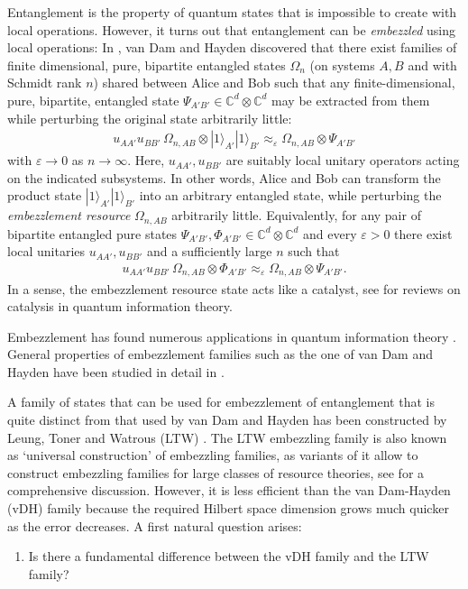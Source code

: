 \documentclass[a4paper, 10pt, onecolumn, accepted=2025-07-22]{quantumarticle}
\theoremstyle{definition}
\newcommand{\ket}[1]{|#1\rangle}
\newcommand{\oo}{\infty}
\newcommand{\ox}{\otimes}
\newcommand{\eps}{\varepsilon}
\def\CC{{\mathbb C}}
\newcommand*{\1}{\text{\usefont{U}{bbold}{m}{n}1}}
\begin{document}
Entanglement is the property of quantum states that is impossible to create with local operations.
However, it turns out that entanglement can be \emph{embezzled} using local operations: In \cite{van_dam2003universal}, van Dam and Hayden discovered that there exist families of finite dimensional, pure, bipartite entangled states $\Omega_n$ (on systems $A,B$ and with Schmidt rank $n$) shared between Alice and Bob such that any finite-dimensional, pure, bipartite, entangled state $\Psi_{A'B'}\in\CC^d\ox\CC^d$ may be extracted from them while perturbing the original state arbitrarily little:
\begin{align}
    u_{AA'}u_{BB'} \,\Omega_{n,AB}\ox \ket 1_{A'}\ket 1_{B'} \approx_\eps \Omega_{n,AB} \ox \Psi_{A'B'}
\end{align}
with $\eps\to 0$ as $n\to \oo$. Here, $u_{AA'},u_{BB'}$ are suitably local unitary operators acting on the indicated subsystems. 
In other words, Alice and Bob can transform the product state $\ket 1_{A'}\ket 1_{B'}$ into an arbitrary entangled state, while perturbing the \emph{embezzlement resource} $\Omega_{n,AB}$ arbitrarily little. 
Equivalently, for any pair of bipartite entangled pure states $\Psi_{A'B'},\Phi_{A'B'}\in\CC^d\otimes\CC^d$ and every $\eps>0$ there exist local unitaries $u_{AA'},u_{BB'}$ and a sufficiently large $n$ such that
\begin{align}
    u_{AA'}u_{BB'} \,\Omega_{n,AB}\ox \Phi_{A'B'} \approx_\eps \Omega_{n,AB} \ox \Psi_{A'B'}.
\end{align}
In a sense, the embezzlement resource state acts like a catalyst, see \cite{datta_catalysis_2023,lipka-bartosik_catalysis_2024} for reviews on catalysis in quantum information theory.  

Embezzlement has found numerous applications in quantum information theory \cite{Bennett_2014,berta_quantum_2011,Leung2019,coladangelo_two-player_2020,Leung2013coherent,regev_quantum_2013,dinur_parallel_2015,cleve_perfect_2017,coladangelo_two-player_2020}.
General properties of embezzlement families such as the one of van Dam and Hayden have been studied in detail in \cite{leung_characteristics_2014,zanoni_complete_2024}.

A family of states that can be used for embezzlement of entanglement that is quite distinct from that used by van Dam and Hayden has been constructed by Leung, Toner and Watrous (LTW) \cite{Leung2013coherent}. The LTW embezzling family is also known as `universal construction' of embezzling families, as variants of it allow to construct embezzling families for large classes of resource theories, see \cite{lipka-bartosik_catalysis_2024} for a comprehensive discussion. 
However, it is less efficient than the van Dam-Hayden (vDH) family because the required Hilbert space dimension grows much quicker as the error decreases. 
A first natural question arises: 
\begin{enumerate}
    \item Is there a fundamental difference between the vDH family and the LTW family?
\end{enumerate}
\end{document}
